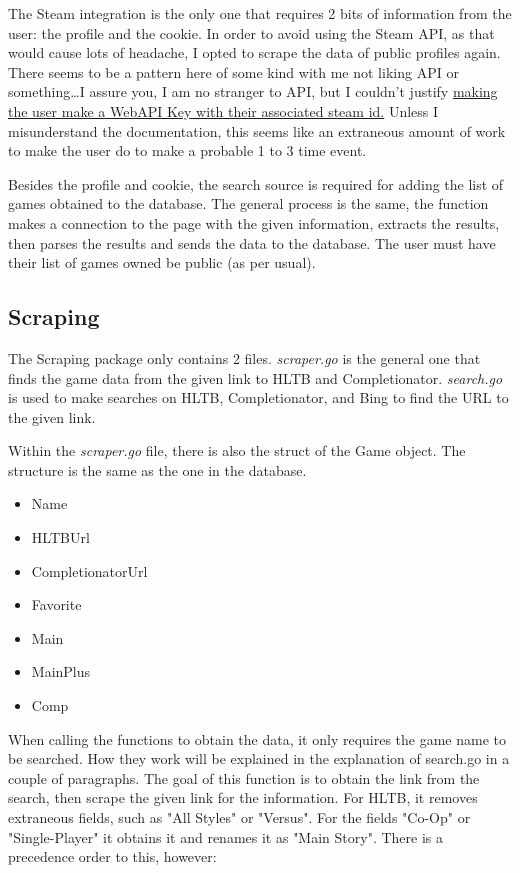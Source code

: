 The Steam integration is the only one that requires 2 bits of
information from the user: the profile and the cookie.
In order to avoid using the Steam API, as that would cause lots of
headache, I opted to scrape the data of public profiles again.
There seems to be a pattern here of some kind with me not liking API
or something\dots I assure you, I am no stranger to API, but I
couldn't justify
\href{https://developer.valvesoftware.com/wiki/Steam_Web_API#GetOwnedGames_(v0001)}{making
the user make a WebAPI Key with their associated steam id.}
Unless I misunderstand the documentation, this seems like an
extraneous amount of work to make the user do to make a probable 1 to
3 time event.

Besides the profile and cookie, the search source is required for
adding the list of games obtained to the database.
The general process is the same, the function makes a connection to
the page with the given information, extracts the results, then
parses the results and sends the data to the database.
The user must have their list of games owned be public (as per usual).

\subsection{Scraping}
\label{subsec:Scraping}

The Scraping package only contains 2 files. \textit{scraper.go} is
the general one that finds the game data from the given link to HLTB
and Completionator. \textit{search.go} is used to make searches on
HLTB, Completionator, and Bing to find the URL to the given link.

Within the \textit{scraper.go} file, there is also the struct of the
Game object.
The structure is the same as the one in the database.
\begin{itemize}
	\item Name
	\item HLTBUrl
	\item CompletionatorUrl
	\item Favorite
	\item Main
	\item MainPlus
	\item Comp
\end{itemize}

When calling the functions to obtain the data, it only requires the
game name to be searched.
How they work will be explained in the explanation of search.go in a
couple of paragraphs.
The goal of this function is to obtain the link from the search, then
scrape the given link for the information.
For HLTB, it removes extraneous fields, such as "All Styles" or
"Versus". For the fields "Co-Op" or "Single-Player" it obtains it and
renames it as "Main Story".
There is a precedence order to this, however:

